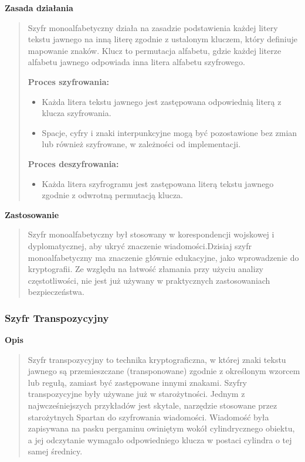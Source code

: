 \documentclass[12pt,a4paper]{article}
\begin{document}
\noindent\textbf{Zasada działania}
\begin{quotation}\noindent Szyfr monoalfabetyczny działa na zasadzie podstawienia każdej litery tekstu jawnego na inną literę zgodnie z ustalonym kluczem, który definiuje mapowanie znaków. Klucz to permutacja alfabetu, gdzie każdej literze alfabetu jawnego odpowiada inna litera alfabetu szyfrowego.\newline

\noindent\textbf{Proces szyfrowania:}
\begin{itemize}
\item Każda litera tekstu jawnego jest zastępowana odpowiednią literą z klucza szyfrowania.
\item Spacje, cyfry i znaki interpunkcyjne mogą być pozostawione bez zmian lub również szyfrowane, w zależności od implementacji.
\end{itemize}

\noindent\textbf{Proces deszyfrowania:}
\begin{itemize}
\item Każda litera szyfrogramu jest zastępowana literą tekstu jawnego zgodnie z odwrotną permutacją klucza.
\end{itemize}
\end{quotation}

\noindent\textbf{Zastosowanie}
\begin{quotation}\noindent Szyfr monoalfabetyczny był stosowany w korespondencji wojskowej i dyplomatycznej, aby ukryć znaczenie wiadomości.Dzisiaj szyfr monoalfabetyczny ma znaczenie głównie edukacyjne, jako wprowadzenie do kryptografii. Ze względu na łatwość złamania przy użyciu analizy częstotliwości, nie jest już używany w praktycznych zastosowaniach bezpieczeństwa.
\end{quotation}



\subsubsection{Szyfr Transpozycyjny}
\noindent\textbf{Opis}
\begin{quotation}\noindent Szyfr transpozycyjny to technika kryptograficzna, w której znaki tekstu jawnego są przemieszczane (transponowane) zgodnie z określonym wzorcem lub regułą, zamiast być zastępowane innymi znakami. Szyfry transpozycyjne były używane już w starożytności. Jednym z najwcześniejszych przykładów jest skytale, narzędzie stosowane przez starożytnych Spartan do szyfrowania wiadomości. Wiadomość była zapisywana na pasku pergaminu owiniętym wokół cylindrycznego obiektu, a jej odczytanie wymagało odpowiedniego klucza w postaci cylindra o tej samej średnicy.
\end{quotation}
\end{document}
